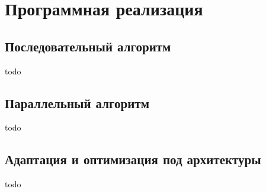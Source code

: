 \section{Программная реализация}

\subsection{Последовательный алгоритм}
todo

\subsection{Параллельный алгоритм}
todo

\subsection{Адаптация и оптимизация под архитектуры}
todo

\clearpage